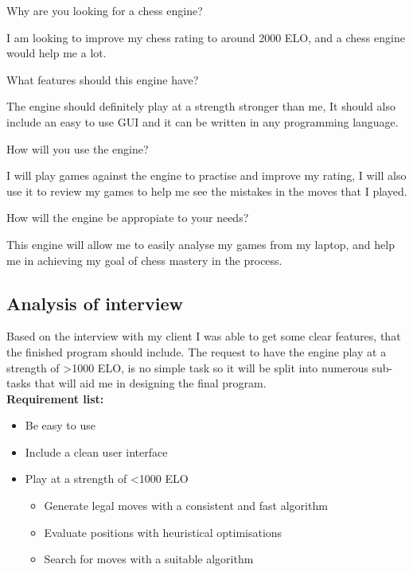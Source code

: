 \begin{tcolorbox}
 Why are you looking for a chess engine?\par
{} I am looking to improve my
chess rating to around 2000 ELO, and a chess engine would
help me a lot.\par
{} What features should this
engine have? \par
{} The engine should definitely
play at a strength stronger than me, It should also include
an easy to use GUI and it can be written in any programming
language.\par
{} How will you use the
engine? \par
{} I will play games against the 
engine to practise and improve my rating, I will also use it
to review my games to help me see the mistakes in the moves 
that I played. \par
{} How will the engine be 
appropiate to your needs? \par
{} This engine will allow me to 
easily analyse my games from my laptop, and help me in 
achieving my goal of chess mastery in the process.
\end{tcolorbox}

\subsection*{Analysis of interview}
Based on the interview with my client I was able to get 
some clear features, that the finished program should
include. The request to have the engine play at a strength
of >1000 ELO, is no simple task so it will be split into
numerous sub-tasks that will aid me in designing the final 
program. \\

\textbf{\large Requirement list:}
\begin{itemize}
  \item Be easy to use
  \item Include a clean user interface
  \item Play at a strength of <1000 ELO

  \begin{itemize}
    \item{Generate legal moves with a consistent and fast
          algorithm}
    \item Evaluate positions with heuristical optimisations
    \item{Search for moves with a suitable algorithm}
  \end{itemize}

\end{itemize}

